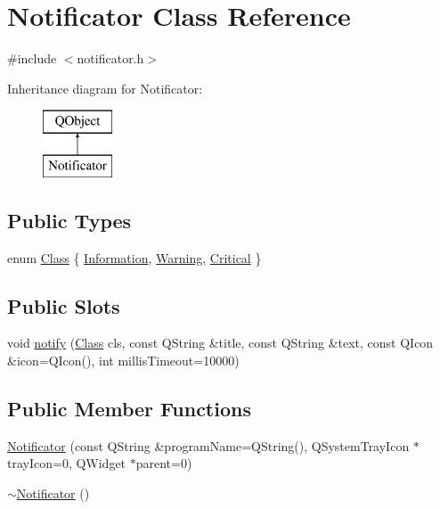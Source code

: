 \hypertarget{class_notificator}{}\section{Notificator Class Reference}
\label{class_notificator}


{\ttfamily \#include $<$notificator.\+h$>$}

Inheritance diagram for Notificator\+:\begin{figure}[H]
\begin{center}
\leavevmode
\includegraphics[height=2.000000cm]{class_notificator}
\end{center}
\end{figure}
\subsection*{Public Types}
\begin{DoxyCompactItemize}
\item 
enum \hyperlink{class_notificator_aa2ff8a05d471e32e77584a2b8dd182ab}{Class} \{ \hyperlink{class_notificator_aa2ff8a05d471e32e77584a2b8dd182aba195b01e918cc724c6ad65f5037e85f83}{Information}, 
\hyperlink{class_notificator_aa2ff8a05d471e32e77584a2b8dd182abac33ad19811d3b1d6b57305dd75d63a5e}{Warning}, 
\hyperlink{class_notificator_aa2ff8a05d471e32e77584a2b8dd182aba596518f9cfdbd57b0fdc68fc95c69ecd}{Critical}
 \}
\end{DoxyCompactItemize}
\subsection*{Public Slots}
\begin{DoxyCompactItemize}
\item 
void \hyperlink{class_notificator_ae08e1e7e85ddc4690f307649021f7fdc}{notify} (\hyperlink{class_notificator_aa2ff8a05d471e32e77584a2b8dd182ab}{Class} cls, const Q\+String \&title, const Q\+String \&text, const Q\+Icon \&icon=Q\+Icon(), int millis\+Timeout=10000)
\end{DoxyCompactItemize}
\subsection*{Public Member Functions}
\begin{DoxyCompactItemize}
\item 
\hyperlink{class_notificator_a160ee34ea7ce46bd20d5684504f53509}{Notificator} (const Q\+String \&program\+Name=Q\+String(), Q\+System\+Tray\+Icon $\ast$tray\+Icon=0, Q\+Widget $\ast$parent=0)
\item 
\hyperlink{class_notificator_a38d79072ff215da9214047c9a8d27e58}{$\sim$\+Notificator} ()
\end{DoxyCompactItemize}


